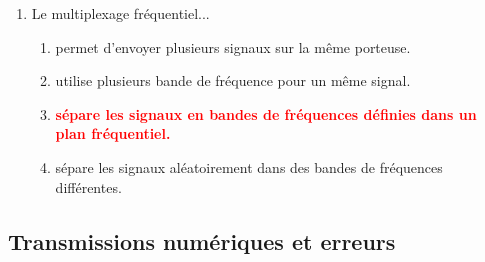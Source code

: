 \documentclass[a4paper]{article}
\begin{document}
\begin{enumerate}[label=Q\arabic*.]
\item Le multiplexage fréquentiel...
\begin{enumerate}
    \item permet d'envoyer plusieurs signaux sur la même porteuse.
    \item utilise plusieurs bande de fréquence pour un même signal.
    \item \textcolor{red}{\textbf{sépare les signaux en bandes de fréquences définies dans un plan fréquentiel.}}
    \item sépare les signaux aléatoirement dans des bandes de fréquences différentes.
\end{enumerate}


\end{enumerate}










\subsection{Transmissions numériques et erreurs}
\end{document}
